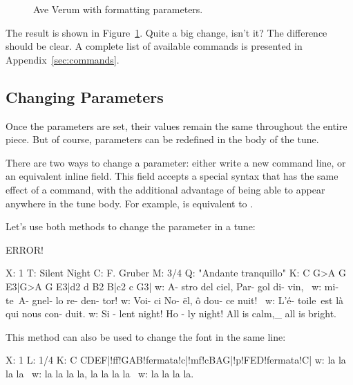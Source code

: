 \documentclass[a4paper,12pt]{book}
\begin{document}
\begin{center}
\begin{figure}[htbp]
\caption{Ave Verum with formatting parameters.}
\label{fig:aveverum}
\end{figure}
\end{center}

The result is shown in Figure~\ref{fig:aveverum}. Quite a big change,
isn't it? The difference should be clear. A complete list of available
commands is presented in Appendix~\ref{sec:commands}.


\subsection{Changing Parameters}
\label{sec:changepar}

Once the parameters are set, their values remain the same throughout
the entire piece. But of course, parameters can be redefined in the
body of the tune.

There are two ways to change a parameter: either write a new command
line, or an equivalent  inline field. This field accepts a
special syntax that has the same effect of a command, with the
additional advantage of being able to appear anywhere in the tune
body. For example,  is equivalent to
.

Let's use both methods to change the  parameter in a
tune:

ERROR!

\begin{abcsource}
X: 1
T: Silent Night
C: F. Gruber
M: 3/4
Q: "Andante tranquillo"
K: C
%
G>A G E3|G>A G E3|d2 d B2 B|c2 c G3|
w: A- stro del ciel, Par- gol di- vin, \
w: mi- te~A- gnel- lo re- den- tor!
w: Voi- ci No- \"el, \^o dou- ce nuit! \
w: L'\'e- toile~est l\`a qui nous con- duit.
w: Si - lent night! Ho - ly night! All is calm,_ all is bright.
\end{abcsource}


This method can also be used to change the font in the same line:

\begin{abcsource}
X: 1
L: 1/4
K: C
CDEF|!ff!GAB!fermata!c|!mf!cBAG|!p!FED!fermata!C|
w: la la la la\
w: la la la la, la la la la\
w: la la la la.
\end{abcsource}
\end{document}
